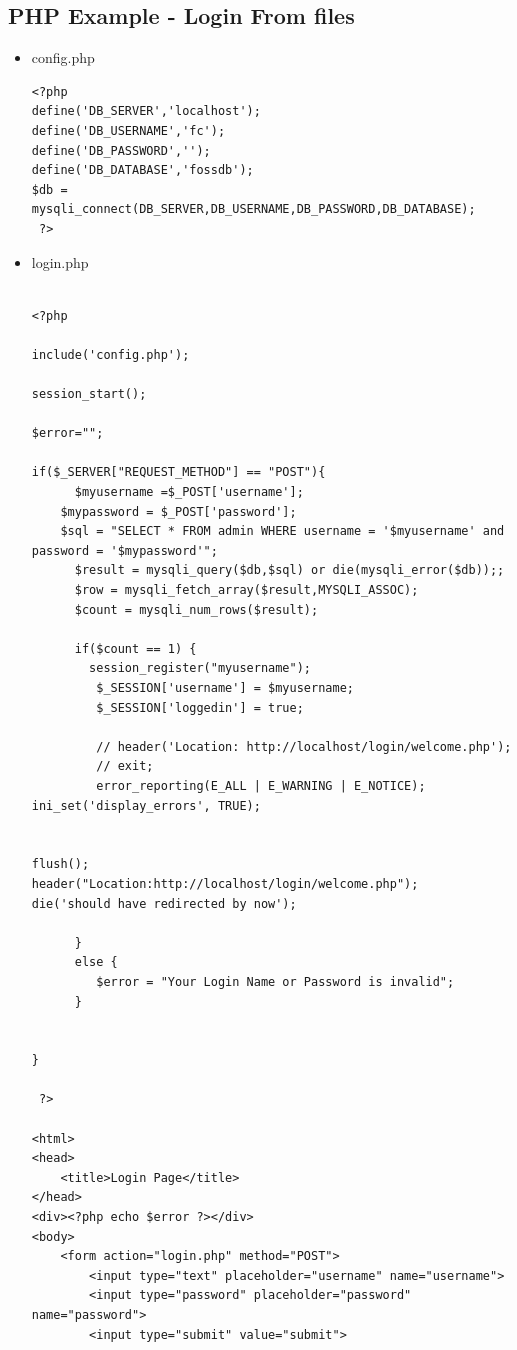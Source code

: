 \documentclass{article}
\begin{document}
\subsection {PHP Example - Login From files}
\begin{itemize}
\item config.php

\begin{verbatim}
<?php 
define('DB_SERVER','localhost');
define('DB_USERNAME','fc');
define('DB_PASSWORD','');
define('DB_DATABASE','fossdb');
$db = mysqli_connect(DB_SERVER,DB_USERNAME,DB_PASSWORD,DB_DATABASE);
 ?>
\end{verbatim}

\item login.php

\begin{verbatim}

<?php 

include('config.php');

session_start();

$error="";

if($_SERVER["REQUEST_METHOD"] == "POST"){
	  $myusername =$_POST['username'];
    $mypassword = $_POST['password'];
    $sql = "SELECT * FROM admin WHERE username = '$myusername' and password = '$mypassword'";
      $result = mysqli_query($db,$sql) or die(mysqli_error($db));;
      $row = mysqli_fetch_array($result,MYSQLI_ASSOC);
      $count = mysqli_num_rows($result);

      if($count == 1) {
        session_register("myusername");
         $_SESSION['username'] = $myusername;
         $_SESSION['loggedin'] = true;

         // header('Location: http://localhost/login/welcome.php');
         // exit;
         error_reporting(E_ALL | E_WARNING | E_NOTICE);
ini_set('display_errors', TRUE);


flush();
header("Location:http://localhost/login/welcome.php");
die('should have redirected by now');

      }
      else {
         $error = "Your Login Name or Password is invalid";
      }


}

 ?>

<html>	
<head>
	<title>Login Page</title>
</head>
<div><?php echo $error ?></div>
<body>
	<form action="login.php" method="POST">
		<input type="text" placeholder="username" name="username">
		<input type="password" placeholder="password" name="password">
		<input type="submit" value="submit">


\end{verbatim}
\end{itemize}
\end{document}
